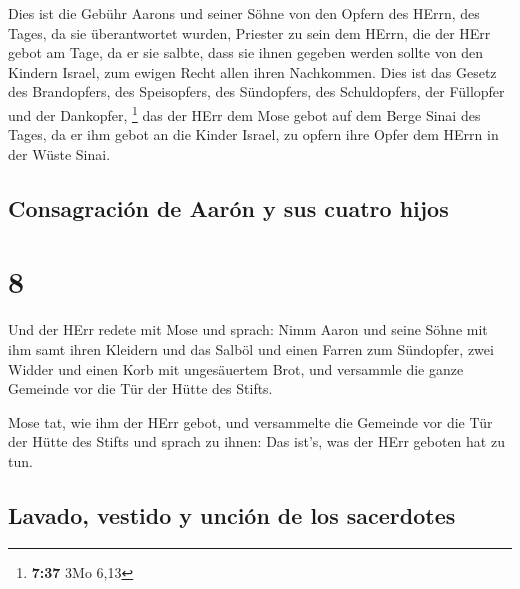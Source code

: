  Dies ist die Gebühr Aarons und seiner Söhne von den
Opfern des HErrn, des Tages, da sie überantwortet wurden, Priester zu
sein dem HErrn,  die der HErr gebot am Tage, da er sie
salbte, dass sie ihnen gegeben werden sollte von den Kindern Israel, zum
ewigen Recht allen ihren Nachkommen.  Dies ist das Gesetz
des Brandopfers, des Speisopfers, des Sündopfers, des Schuldopfers, der
Füllopfer und der Dankopfer, \footnote{\textbf{7:37} 3Mo 6,13}
 das der HErr dem Mose gebot auf dem Berge Sinai des
Tages, da er ihm gebot an die Kinder Israel, zu opfern ihre Opfer dem
HErrn in der Wüste Sinai.

\hypertarget{consagraciuxf3n-de-aaruxf3n-y-sus-cuatro-hijos}{%
\subsection{Consagración de Aarón y sus cuatro
hijos}\label{consagraciuxf3n-de-aaruxf3n-y-sus-cuatro-hijos}}

\hypertarget{section-7}{%
\section{8}\label{section-7}}

 Und der HErr redete mit Mose und sprach: 
Nimm Aaron und seine Söhne mit ihm samt ihren Kleidern und das Salböl
und einen Farren zum Sündopfer, zwei Widder und einen Korb mit
ungesäuertem Brot,  und versammle die ganze Gemeinde vor
die Tür der Hütte des Stifts.

 Mose tat, wie ihm der HErr gebot, und versammelte die
Gemeinde vor die Tür der Hütte des Stifts  und sprach zu
ihnen: Das ist's, was der HErr geboten hat zu tun.

\hypertarget{lavado-vestido-y-unciuxf3n-de-los-sacerdotes}{%
\subsection{Lavado, vestido y unción de los
sacerdotes}\label{lavado-vestido-y-unciuxf3n-de-los-sacerdotes}}

